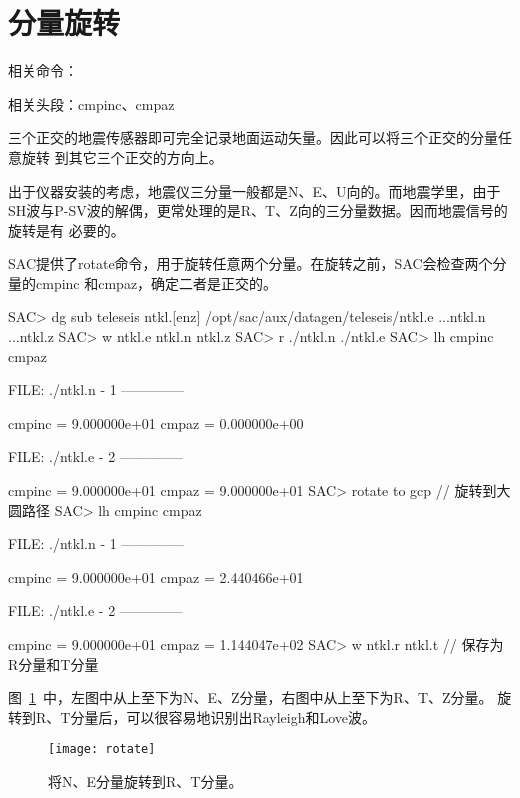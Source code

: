 \section{分量旋转}
\label{sec:traces-rotating}
相关命令：

相关头段：cmpinc、cmpaz

三个正交的地震传感器即可完全记录地面运动矢量。因此可以将三个正交的分量任意旋转
到其它三个正交的方向上。

出于仪器安装的考虑，地震仪三分量一般都是N、E、U向的。而地震学里，由于
SH波与P-SV波的解偶，更常处理的是R、T、Z向的三分量数据。因而地震信号的旋转是有
必要的。

SAC提供了rotate命令，用于旋转任意两个分量。在旋转之前，SAC会检查两个分量的cmpinc
和cmpaz，确定二者是正交的。

\begin{SACCode}
SAC> dg sub teleseis ntkl.[enz]
/opt/sac/aux/datagen/teleseis/ntkl.e ...ntkl.n ...ntkl.z
SAC> w ntkl.e ntkl.n ntkl.z
SAC> r ./ntkl.n ./ntkl.e
SAC> lh cmpinc cmpaz
  
  FILE: ./ntkl.n - 1
 --------------

     cmpinc = 9.000000e+01
      cmpaz = 0.000000e+00
  
  FILE: ./ntkl.e - 2
 --------------

     cmpinc = 9.000000e+01
      cmpaz = 9.000000e+01
SAC> rotate to gcp              // 旋转到大圆路径
SAC> lh cmpinc cmpaz
  
  FILE: ./ntkl.n - 1
 --------------

     cmpinc = 9.000000e+01
      cmpaz = 2.440466e+01
  
  FILE: ./ntkl.e - 2
 --------------

     cmpinc = 9.000000e+01
      cmpaz = 1.144047e+02
SAC> w ntkl.r ntkl.t            // 保存为R分量和T分量
\end{SACCode}

图~\ref{fig:rotate}~中，左图中从上至下为N、E、Z分量，右图中从上至下为R、T、Z分量。
旋转到R、T分量后，可以很容易地识别出Rayleigh和Love波。

\begin{figure}[H]
\centering
\texttt{[image: rotate]}
\caption[水平分量旋转]{将N、E分量旋转到R、T分量。}
\label{fig:rotate}
\end{figure}
